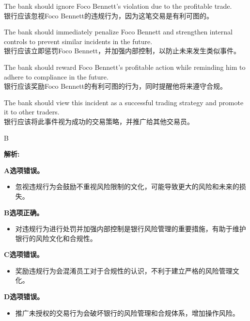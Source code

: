 \documentclass{article}
\newenvironment{explanation}
{\textbf{解析:}\par}
{\par}
\begin{document}
    \begin{choices}
        \item The bank should ignore Foco Bennett's violation due to the profitable trade.\\
        银行应该忽视Foco Bennett的违规行为，因为这笔交易是有利可图的。
        \item The bank should immediately penalize Foco Bennett and strengthen internal controls to prevent similar incidents in the future.\\
        银行应该立即惩罚Foco Bennett，并加强内部控制，以防止未来发生类似事件。
        \item The bank should reward Foco Bennett's profitable action while reminding him to adhere to compliance in the future.\\
        银行应该奖励Foco Bennett的有利可图的行为，同时提醒他将来遵守合规。
        \item The bank should view this incident as a successful trading strategy and promote it to other traders.\\
        银行应该将此事件视为成功的交易策略，并推广给其他交易员。
    \end{choices}
    
    \begin{correctanswer}
        B
    \end{correctanswer}
    
    \begin{explanation}
        \textbf{A选项错误。}
        \begin{itemize}
            \item 忽视违规行为会鼓励不重视风险限制的文化，可能导致更大的风险和未来的损失。
        \end{itemize}
    
        \textbf{B选项正确。}
        \begin{itemize}
            \item 对违规行为进行处罚并加强内部控制是银行风险管理的重要措施，有助于维护银行的风险文化和合规性。
        \end{itemize}
    
        \textbf{C选项错误。}
        \begin{itemize}
            \item 奖励违规行为会混淆员工对于合规性的认识，不利于建立严格的风险管理文化。
        \end{itemize}
    
        \textbf{D选项错误。}
        \begin{itemize}
            \item 推广未授权的交易行为会破坏银行的风险管理和合规体系，增加操作风险。
        \end{itemize}
    \end{explanation}
    
\end{document}
